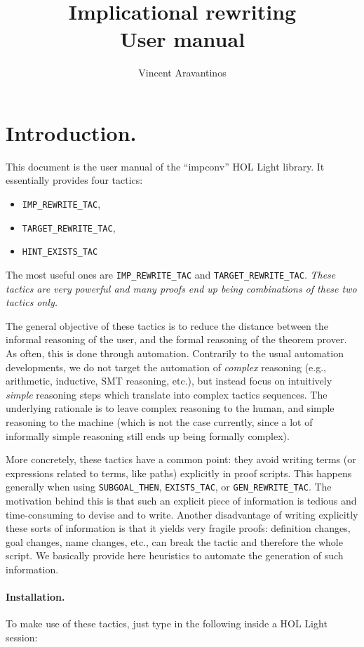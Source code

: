 \documentclass{llncs}
\title{Implicational rewriting\\User manual}
\author{Vincent Aravantinos}
\institute{
  \url{vincent.aravantinos@fortiss.org}\\
  Analysis and Design of Dependable Systems, fortiss GmbH, Munich, Germany\footnote{%
formerly: Hardware Verification Group, Concordia University, Montreal, Canada}}
\newcommand*\IMPREWRITETAC{\texttt{IMP\_REWRITE\_TAC}\xspace}
\newcommand*\GENTAC{\texttt{GEN\_REWRITE\_TAC}\xspace}
\newcommand*\SUBGOAL{\texttt{SUBGOAL\_THEN}\xspace}
\newcommand*\TARGETTAC{\texttt{TARGET\_REWRITE\_TAC}\xspace}
\newcommand*\HINTTAC{\texttt{HINT\_EXISTS\_TAC}\xspace}
\newcommand*\EXISTS{\texttt{EXISTS\_TAC}\xspace}
\begin{document}
  \maketitle

  \section{Introduction.}
		This document is the user manual of the ``impconv'' HOL Light library.
    It essentially provides four tactics:
    \begin{itemize}
      \item \IMPREWRITETAC,
      \item \TARGETTAC,
      \item \HINTTAC
    \end{itemize}
    The most useful ones are \IMPREWRITETAC and \TARGETTAC.
    \emph{These tactics are very powerful and many proofs end up being combinations of these two tactics only.}

    The general objective of these tactics is to reduce the distance between the informal reasoning
    of the user, and the formal reasoning of the theorem prover.
    As often, this is done through automation.
    Contrarily to the usual automation developments, we do not target the automation of \emph{complex} reasoning
    (e.g., arithmetic, inductive, SMT reasoning, etc.),
    but instead focus on intuitively \emph{simple} reasoning steps which
    translate into complex tactics sequences.
    The underlying rationale is to leave complex reasoning to the human,
    and simple reasoning to the machine (which is not the case currently, since a lot of informally simple
    reasoning still ends up being formally complex).
   
    More concretely, these tactics have a common point: they avoid writing terms 
    (or expressions related to terms, like paths) explicitly in proof scripts.
    This happens generally when using \SUBGOAL, \EXISTS, or \GENTAC.
    The motivation behind this is that such an explicit piece of information
    is tedious and time-consuming to devise and to write.
    Another disadvantage of writing explicitly these sorts of information is that it yields very fragile proofs:
    definition changes, goal changes, name changes, etc., can break the tactic and therefore the whole script.
    We basically provide here heuristics to automate the generation of such information.

  \paragraph{Installation.}
    To make use of these tactics, just type in the following inside a HOL Light session:
\end{document}
